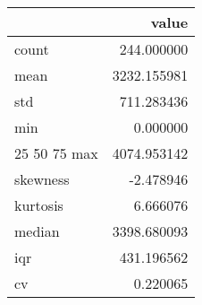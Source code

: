 \begin{tabular}{lr}
\toprule
 & value \\
\midrule
count & 244.000000 \\
mean & 3232.155981 \\
std & 711.283436 \\
min & 0.000000 \\
25%
50%
75%
max & 4074.953142 \\
skewness & -2.478946 \\
kurtosis & 6.666076 \\
median & 3398.680093 \\
iqr & 431.196562 \\
cv & 0.220065 \\
\bottomrule
\end{tabular}
